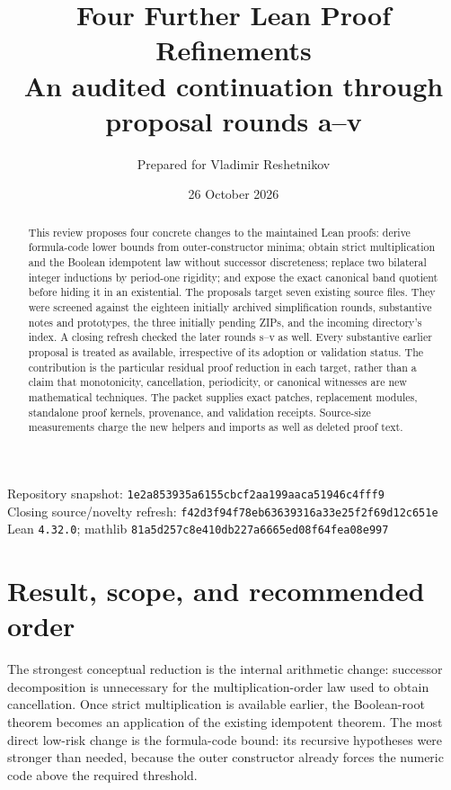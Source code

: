 \documentclass[11pt,letterpaper]{article}
\title{\color{ink}\sffamily Four Further Lean Proof Refinements\\[5pt]\large An audited continuation through proposal rounds a--v}
\author{Prepared for Vladimir Reshetnikov}
\date{26 October 2026}
\newcommand{\code}[1]{\nolinkurl{#1}}
\begin{document}
\maketitle
\begin{center}\small
Repository snapshot: \code{1e2a853935a6155cbcf2aa199aaca51946c4fff9}\\
Closing source/novelty refresh: \code{f42d3f94f78eb63639316a33e25f2f69d12c651e}\\
Lean \code{4.32.0}; mathlib \code{81a5d257c8e410db227a6665ed08f64fea08e997}
\end{center}
\begin{abstract}
This review proposes four concrete changes to the maintained Lean proofs: derive formula-code lower bounds from outer-constructor minima; obtain strict multiplication and the Boolean idempotent law without successor discreteness; replace two bilateral integer inductions by period-one rigidity; and expose the exact canonical band quotient before hiding it in an existential. The proposals target seven existing source files. They were screened against the eighteen initially archived simplification rounds, substantive notes and prototypes, the three initially pending ZIPs, and the incoming directory's index. A closing refresh checked the later rounds s--v as well. Every substantive earlier proposal is treated as available, irrespective of its adoption or validation status. The contribution is the particular residual proof reduction in each target, rather than a claim that monotonicity, cancellation, periodicity, or canonical witnesses are new mathematical techniques. The packet supplies exact patches, replacement modules, standalone proof kernels, provenance, and validation receipts. Source-size measurements charge the new helpers and imports as well as deleted proof text.
\end{abstract}
\tableofcontents
\newpage

\section{Result, scope, and recommended order}
The strongest conceptual reduction is the internal arithmetic change: successor decomposition is unnecessary for the multiplication-order law used to obtain cancellation. Once strict multiplication is available earlier, the Boolean-root theorem becomes an application of the existing idempotent theorem. The most direct low-risk change is the formula-code bound: its recursive hypotheses were stronger than needed, because the outer constructor already forces the numeric code above the required threshold.
\end{document}
